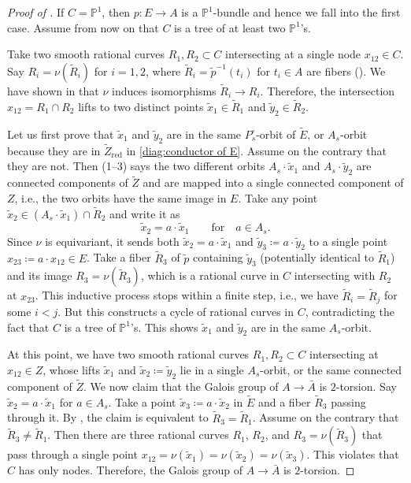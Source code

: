 \documentclass[reqno, letterpaper]{amsart}
\numberwithin{equation}{subsection}
\let\to\longrightarrow
\newcommand{\PP}{\mathbb{P}}
\DeclareMathOperator{\red}{red}
\begin{document}
		\begin{proof}[Proof of ]
			If $C = \PP^1$, then $p : E \to A$ is a $\PP^1$-bundle and hence we fall into the first case. Assume from now on that $C$ is a tree of at least two $\PP^1$'s.
			
			\medskip
			
			Take two smooth rational curves $R_1, R_2 \subset C$ intersecting at a single node $x_{12} \in C$. Say $R_i = \nu(\tilde R_i)$ for $i = 1, 2$, where $\tilde R_i = \tilde p^{-1}(t_i)$ for $t_i \in A$ are fibers (). We have shown in  that $\nu$ induces isomorphisms $\tilde R_i \to R_i$. Therefore, the intersection $x_{12} = R_1 \cap R_2$ lifts to two distinct points $\tilde x_1 \in \tilde R_1$ and $\tilde y_2 \in \tilde R_2$.
			
			Let us first prove that $\tilde x_1$ and $\tilde y_2$ are in the same $P^\circ_s$-orbit of $\tilde E$, or $A_s$-orbit because they are in $\tilde Z_{\red}$ in \eqref{diag:conductor of E}. Assume on the contrary that they are not. Then (1--3) says the two different orbits $A_s \cdot \tilde x_1$ and $A_s \cdot \tilde y_2$ are connected components of $\tilde Z$ and are mapped into a single connected component of $Z$, i.e., the two orbits have the same image in $E$. Take any point $\tilde x_2 \in (A_s \cdot \tilde x_1) \cap \tilde R_2$ and write it as
			\[ \tilde x_2 = a \cdot \tilde x_1 \qquad\mbox{for}\quad a \in A_s .\]
			Since $\nu$ is equivariant, it sends both $\tilde x_2 = a \cdot \tilde x_1$ and $\tilde y_3 \coloneq a \cdot \tilde y_2$ to a single point $x_{23} \coloneq a \cdot x_{12} \in E$. Take a fiber $\tilde R_3$ of $\tilde p$ containing $\tilde y_3$ (potentially identical to $\tilde R_1$) and its image $R_3 = \nu(\tilde R_3)$, which is a rational curve in $C$ intersecting with $R_2$ at $x_{23}$. This inductive process stops within a finite step, i.e., we have $\tilde R_i = \tilde R_j$ for some $i < j$. But this constructs a cycle of rational curves in $C$, contradicting the fact that $C$ is a tree of $\PP^1$'s. This shows $\tilde x_1$ and $\tilde y_2$ are in the same $A_s$-orbit.
			
			\medskip
			
			At this point, we have two smooth rational curves $R_1, R_2 \subset C$ intersecting at $x_{12} \in Z$, whose lifts $\tilde x_1$ and $\tilde x_2 \coloneq \tilde y_2$ lie in a single $A_s$-orbit, or the same connected component of $\tilde Z$. We now claim that the Galois group of $A \to \bar A$ is $2$-torsion. Say $\tilde x_2 = a \cdot \tilde x_1$ for $a \in A_s$. Take a point $\tilde x_3 \coloneq a \cdot \tilde x_2$ in $\tilde E$ and a fiber $\tilde R_3$ passing through it. By , the claim is equivalent to $\tilde R_3 = \tilde R_1$. Assume on the contrary that $\tilde R_3 \neq \tilde R_1$. Then there are three rational curves $R_1$, $R_2$, and $R_3 = \nu(\tilde R_3)$ that pass through a single point $x_{12} = \nu(\tilde x_1) = \nu(\tilde x_2) = \nu(\tilde x_3)$. This violates that $C$ has only nodes. Therefore, the Galois group of $A \to \bar A$ is $2$-torsion.
			

\end{proof}
\end{document}
